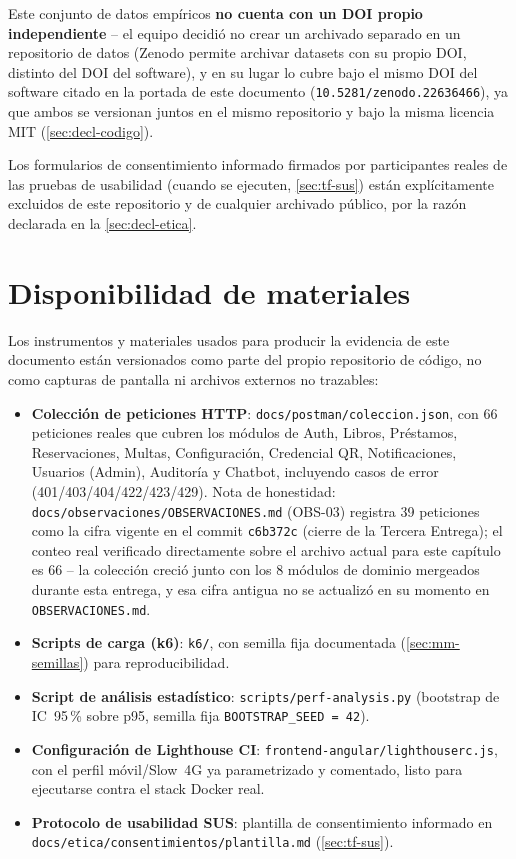 Este conjunto de datos empíricos \textbf{no cuenta con un DOI propio
independiente} -- el equipo decidió no crear un archivado separado en
un repositorio de datos (Zenodo permite archivar datasets con su
propio DOI, distinto del DOI del software), y en su lugar lo cubre
bajo el mismo DOI del software citado en la portada de este documento
(\texttt{10.5281/zenodo.22636466}), ya que ambos se versionan juntos
en el mismo repositorio y bajo la misma licencia MIT
(\autoref{sec:decl-codigo}).

Los formularios de consentimiento informado firmados por participantes
reales de las pruebas de usabilidad (cuando se ejecuten,
\autoref{sec:tf-sus}) están explícitamente excluidos de este
repositorio y de cualquier archivado público, por la razón declarada en
la \autoref{sec:decl-etica}.

\section{Disponibilidad de materiales}

Los instrumentos y materiales usados para producir la evidencia de este
documento están versionados como parte del propio repositorio de
código, no como capturas de pantalla ni archivos externos no
trazables:

\begin{itemize}[leftmargin=1.2cm]
  \item \textbf{Colección de peticiones HTTP}: \texttt{docs/postman/coleccion.json},
    con 66 peticiones reales que cubren los módulos de
    Auth, Libros, Préstamos, Reservaciones, Multas, Configuración,
    Credencial QR, Notificaciones, Usuarios (Admin), Auditoría y
    Chatbot, incluyendo casos de error (401/403/404/422/423/429). Nota
    de honestidad: \texttt{docs/observaciones/OBSERVACIONES.md} (OBS-03)
    registra 39 peticiones como la cifra vigente en el commit
    \texttt{c6b372c} (cierre de la Tercera Entrega); el conteo real
    verificado directamente sobre el archivo actual para este capítulo
    es 66 -- la colección creció junto con los 8 módulos de dominio
    mergeados durante esta entrega, y esa cifra antigua no se actualizó
    en su momento en \texttt{OBSERVACIONES.md}.
  \item \textbf{Scripts de carga (k6)}: \texttt{k6/}, con semilla fija
    documentada (\autoref{sec:mm-semillas}) para reproducibilidad.
  \item \textbf{Script de análisis estadístico}: \texttt{scripts/perf-analysis.py}
    (bootstrap de IC~95\,\% sobre p95, semilla fija \texttt{BOOTSTRAP\_SEED = 42}).
  \item \textbf{Configuración de Lighthouse CI}: \texttt{frontend-angular/lighthouserc.js},
    con el perfil móvil/Slow~4G ya parametrizado y comentado, listo para
    ejecutarse contra el stack Docker real.
  \item \textbf{Protocolo de usabilidad SUS}: plantilla de consentimiento
    informado en \texttt{docs/etica/consentimientos/plantilla.md}
    (\autoref{sec:tf-sus}).
\end{itemize}

